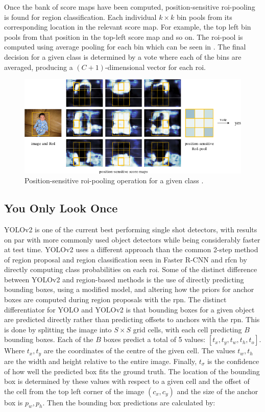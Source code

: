 Once the bank of score maps have been computed, position-sensitive \gls{roi}-pooling is found for region classification. Each individual $k \times k$ bin pools from its corresponding location in the relevant score map. For example, the top left bin pools from that position in the top-left score map and so on. The \gls{roi}-pool is computed using average pooling for each bin which can be seen in . The final decision for a given class is determined by a vote where each of the bins are averaged, producing a $(C+1)$-dimensional vector for each \gls{roi}.

\begin{figure}[H]
  \centering
    \includegraphics[width=1.0\textwidth]{Figs/Techanal/rfcnpooling.png}
      \caption{Position-sensitive \gls{roi}-pooling operation for a given class \cite{rfcn}.}
    \label{fig:rfcnpooling}
\end{figure}

\subsection{You Only Look Once}
YOLOv2 \cite{yolov2} is one of the current best performing single shot detectors, with results on par with more commonly used object detectors while being considerably faster at test time. YOLOv2 uses a different approach than the common 2-step method of region proposal and region classification seen in Faster R-CNN and \gls{rfcn} by directly computing class probabilities on each \gls{roi}. Some of the distinct difference between YOLOv2 and region-based methods is the use of directly predicting bounding boxes, using a modified model, and altering how the priors for anchor boxes are computed during region proposals with the \gls{rpn}. The distinct differentiator for YOLO and YOLOv2 is that bounding boxes for a given object are predicted directly rather than predicting offsets to anchors with the \gls{rpn}. This is done by splitting the image into $S \times S$ grid cells, with each cell predicting $B$ bounding boxes. Each of the $B$ boxes predict a total of 5 values: $[t_x, t_y, t_w, t_h, t_o]$. Where $t_x, t_y$ are the coordinates of the centre of the given cell. The values $t_w, t_h$ are the width and height relative to the entire image. Finally, $t_\sigma$ is the confidence of how well the predicted box fits the ground truth. The location of the bounding box is determined by these values with respect to a given cell and the offset of the cell from the top left corner of the image $(c_x, c_y)$ and the size of the anchor box is $p_w, p_h$. Then the bounding box predictions are calculated by:

